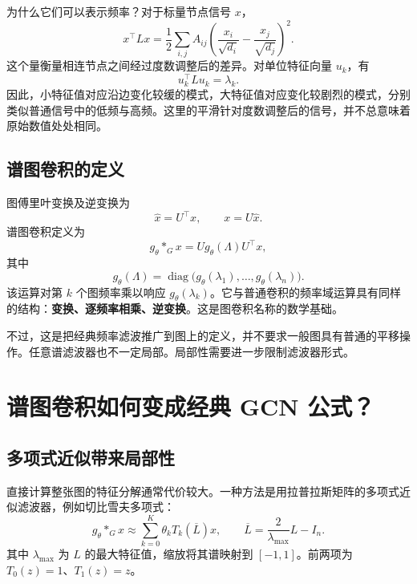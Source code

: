 \documentclass[UTF8,a4paper,11pt,fontset=fandol]{ctexart}
\begin{document}
为什么它们可以表示频率？对于标量节点信号 $x$，
\begin{equation}
x^\top Lx=\frac12\sum_{i,j}A_{ij}
\left(\frac{x_i}{\sqrt{d_i}}-\frac{x_j}{\sqrt{d_j}}\right)^2.
\end{equation}
这个量衡量相连节点之间经过度数调整后的差异。对单位特征向量 $u_k$，有
\begin{equation}
u_k^\top Lu_k=\lambda_k.
\end{equation}
因此，小特征值对应沿边变化较缓的模式，大特征值对应变化较剧烈的模式，分别类似普通信号中的低频与高频。这里的平滑针对度数调整后的信号，并不总意味着原始数值处处相同。

\subsection{谱图卷积的定义}
图傅里叶变换及逆变换为
\begin{equation}
\widehat x=U^\top x,\qquad x=U\widehat x.
\end{equation}
谱图卷积定义为
\begin{equation}
\boxed{g_\theta *_G x=U g_\theta(\Lambda)U^\top x,}
\label{eq:spectral}
\end{equation}
其中
\begin{equation}
g_\theta(\Lambda)=\operatorname{diag}
\bigl(g_\theta(\lambda_1),\ldots,g_\theta(\lambda_n)\bigr).
\end{equation}
该运算对第 $k$ 个图频率乘以响应 $g_\theta(\lambda_k)$。它与普通卷积的频率域运算具有同样的结构：\textbf{变换、逐频率相乘、逆变换}。这是图卷积名称的数学基础。

不过，这是把经典频率滤波推广到图上的定义，并不要求一般图具有普通的平移操作。任意谱滤波器也不一定局部。局部性需要进一步限制滤波器形式。

\section{谱图卷积如何变成经典 GCN 公式？}
\subsection{多项式近似带来局部性}
直接计算整张图的特征分解通常代价较大。一种方法是用拉普拉斯矩阵的多项式近似滤波器，例如切比雪夫多项式：
\begin{equation}
g_\theta *_G x\approx
\sum_{k=0}^{K}\theta_kT_k(\overline L)x,
\qquad
\overline L=\frac{2}{\lambda_{\max}}L-I_n.
\end{equation}
其中 $\lambda_{\max}$ 为 $L$ 的最大特征值，缩放将其谱映射到 $[-1,1]$。前两项为 $T_0(z)=1$、$T_1(z)=z$。
\end{document}

